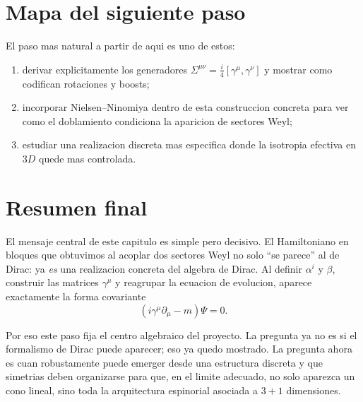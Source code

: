 \section{Mapa del siguiente paso}
El paso mas natural a partir de aqui es uno de estos:
\begin{enumerate}[label=\arabic*.]
    \item derivar explicitamente los generadores
    \(
    \Sigma^{\mu\nu}=\frac{i}{4}[\gamma^\mu,\gamma^\nu]
    \)
    y mostrar como codifican rotaciones y boosts;
    \item incorporar Nielsen--Ninomiya dentro de esta construccion concreta para ver como el doblamiento condiciona la aparicion de sectores Weyl;
    \item estudiar una realizacion discreta mas especifica donde la isotropia efectiva en \(3D\) quede mas controlada.
\end{enumerate}

\section{Resumen final}
El mensaje central de este capitulo es simple pero decisivo. El Hamiltoniano en bloques que obtuvimos al acoplar dos sectores Weyl no solo \enquote{se parece} al de Dirac: ya \emph{es} una realizacion concreta del algebra de Dirac. Al definir $\alpha^i$ y $\beta$, construir las matrices $\gamma^\mu$ y reagrupar la ecuacion de evolucion, aparece exactamente la forma covariante
\[
(i\gamma^\mu\partial_\mu-m)\Psi=0.
\]

Por eso este paso fija el centro algebraico del proyecto. La pregunta ya no es si el formalismo de Dirac puede aparecer; eso ya quedo mostrado. La pregunta ahora es cuan robustamente puede emerger desde una estructura discreta y que simetrias deben organizarse para que, en el limite adecuado, no solo aparezca un cono lineal, sino toda la arquitectura espinorial asociada a \(3+1\) dimensiones.
